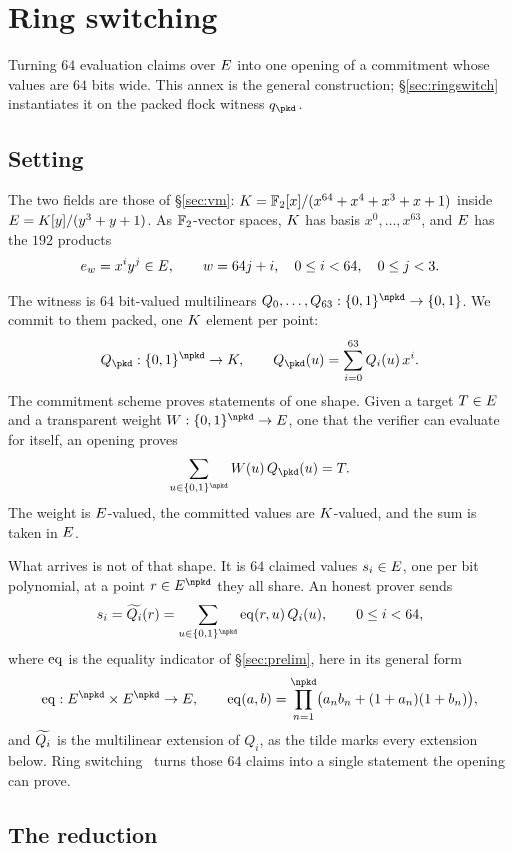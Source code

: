 \section{Ring switching}\label{annex:rs}

Turning $64$ evaluation claims over $E$ into one opening of a commitment whose values are $64$ bits wide. This annex is the general construction; \S\ref{sec:ringswitch} instantiates it on the packed flock witness $q_\pkd$.

\subsection{Setting}\label{rs:setting}

The two fields are those of \S\ref{sec:vm}: $K=\mathbb{F}_2[x]/(x^{64}+x^4+x^3+x+1)$ inside $E=K[y]/(y^3+y+1)$. As $\mathbb{F}_2$-vector spaces, $K$ has basis $x^0,\dots,x^{63}$, and $E$ has the $192$ products
\[
e_w=x^iy^j\in E,\qquad w=64j+i,\quad 0\le i<64,\quad 0\le j<3.
\]

The witness is $64$ bit-valued multilinears $Q_0,\dots,Q_{63}:\cube{\npkd}\to\{0,1\}$. We commit to them packed, one $K$ element per point:
\[
Q_\pkd:\cube{\npkd}\to\K,\qquad Q_\pkd(u)=\sum_{i=0}^{63}Q_i(u)\,x^i.
\]
The commitment scheme proves statements of one shape. Given a target $T\in E$ and a transparent weight $W:\cube{\npkd}\to\E$, one that the verifier can evaluate for itself, an opening proves
\[
\sum_{u\in\cube{\npkd}}W(u)\,Q_\pkd(u)=T.
\]
The weight is $E$-valued, the committed values are $K$-valued, and the sum is taken in $E$.

What arrives is not of that shape. It is $64$ claimed values $s_i\in E$, one per bit polynomial, at a point $r\in\E^{\npkd}$ they all share. An honest prover sends
\[
s_i=\mle{Q_i}(r)=\sum_{u\in\cube{\npkd}}\eq(r,u)\,Q_i(u),\qquad 0\le i<64,
\]
where $\operatorname{eq}$ is the equality indicator of \S\ref{sec:prelim}, here in its general form
\[
\eq:\E^{\npkd}\times\E^{\npkd}\to\E,
\qquad
\eq(a,b)=\prod_{n=1}^{\npkd}\bigl(a_nb_n+(1+a_n)(1+b_n)\bigr),
\]
and $\widetilde{Q_i}$ is the multilinear extension of $Q_i$, as the tilde marks every extension below.
Ring switching~\cite{DP26} turns those $64$ claims into a single statement the opening can prove.

\subsection{The reduction}\label{rs:reduction}

